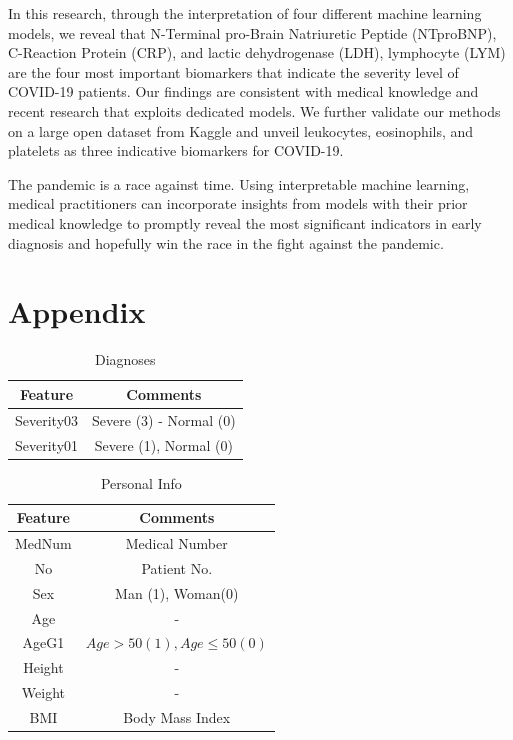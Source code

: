 In this research, through the interpretation of four different machine learning models, we reveal that N-Terminal pro-Brain Natriuretic Peptide (NTproBNP), C-Reaction Protein (CRP), and lactic dehydrogenase (LDH), lymphocyte (LYM) are the four most important biomarkers that indicate the severity level of COVID-19 patients. Our findings are consistent with medical knowledge and recent research that exploits dedicated models. We further validate our methods on a large open dataset from Kaggle and unveil leukocytes, eosinophils, and platelets as three indicative biomarkers for COVID-19.

The pandemic is a race against time. Using interpretable machine learning, medical practitioners can incorporate insights from models with their prior medical knowledge to promptly reveal the most significant indicators in early diagnosis and hopefully win the race in the fight against the pandemic.



\chapter{Appendix}

\begin{table}[H]
\centering
\begin{tabular}{@{}cc@{}}
\toprule
Feature                   & Comments  \\ 
\toprule
Severity03 & Severe (3) - Normal (0) \\
Severity01 & Severe (1), Normal (0)	\\
\bottomrule
\end{tabular}
\caption{Diagnoses}
\end{table}

\begin{table}[H]
\centering
\begin{tabular}{@{}cc@{}}
\toprule
Feature                   & Comments \\ 
\toprule
MedNum           & Medical Number  \\
No            & Patient No.         \\  
Sex  & Man (1), Woman(0)          \\  
Age	& - \\
AgeG1 &	$Age > 50 (1), Age \leq 50 (0)$ \\
Height &  -	 \\
Weight &  - \\
BMI	 & Body Mass Index   \\
\bottomrule
\end{tabular}
\caption{Personal Info}
\end{table}

